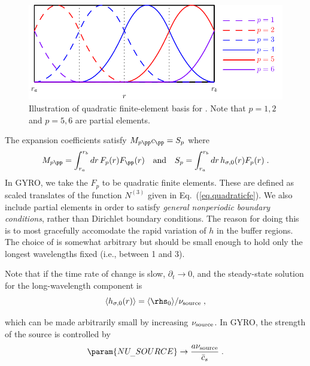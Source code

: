 \begin{figure}
\begin{center}
\includegraphics[scale=1.0]{figures/source.pdf}
\caption{Illustration of quadratic finite-element basis for
  .  Note that $p=1,2$ and $p=5,6$ are 
partial elements.}
\label{fig.source}
\end{center}
\end{figure}

\noindent
The expansion coefficients satisfy $M_{p\pp} c_{\pp} = S_p$ where
%
\begin{equation}
M_{p\pp} = \int_{r_a}^{r_b} dr \, F_p(r) F_{\pp}(r) 
\quad\mbox{and}\quad
S_p = \int_{r_a}^{r_b} dr \,h_{\sigma,0}(r) F_p(r) \; . 
\end{equation}
In GYRO, we take the $F_p$ to be quadratic finite elements.  These 
are defined as scaled translates of the function $N^{(3)}$ given in 
Eq.~(\ref{eq.quadraticfe}).  We also include partial elements in
order to satisfy {\it general nonperiodic boundary conditions}, 
rather than Dirichlet boundary conditions.  The reason for doing this 
is to most gracefully accomodate the rapid variation of $h$ in 
the buffer regions. The choice of  is somewhat 
arbitrary but should be small enough to hold only the longest 
wavelengths fixed (i.e., between 1 and 3).

Note that if the time rate of change is slow, $\partial_t \rightarrow 0$, 
and the steady-state solution for the long-wavelength component is 
%
\begin{equation}
 \langle h_{\sigma,0}(r) \rangle = 
  \langle \rhs_0\rangle /\nu_{\rm source} \; ,
\end{equation}

\noindent
which can be made arbitrarily small by increasing $\nu_{\rm source}$.
In GYRO, the strength of the source is controlled by  
%
\begin{equation}
\param{NU_\_SOURCE} 
  \rightarrow \frac{a \nu_{\rm source}}{\bar{c}_s} \; . 
\end{equation}

